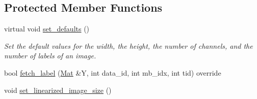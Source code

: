 \subsection*{Protected Member Functions}
\begin{DoxyCompactItemize}
\item 
virtual void \hyperlink{classlbann_1_1image__data__reader_a8e9dbeaa0239d56597455cc23787a21d}{set\+\_\+defaults} ()
\begin{DoxyCompactList}\small\item\em Set the default values for the width, the height, the number of channels, and the number of labels of an image. \end{DoxyCompactList}\item 
bool \hyperlink{classlbann_1_1image__data__reader_a1f0dbd67390a65fef106515ea7060e29}{fetch\+\_\+label} (\hyperlink{base_8hpp_a68f11fdc31b62516cb310831bbe54d73}{Mat} \&Y, int data\+\_\+id, int mb\+\_\+idx, int tid) override
\item 
void \hyperlink{classlbann_1_1image__data__reader_a0164b0e3abbe92daef73b36fb925403e}{set\+\_\+linearized\+\_\+image\+\_\+size} ()
\end{DoxyCompactItemize}
